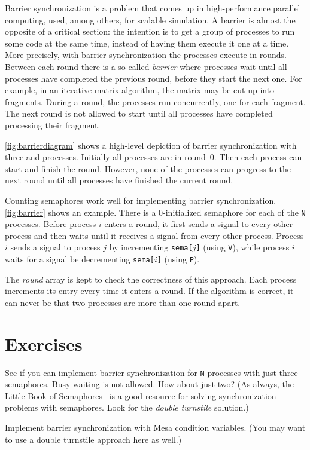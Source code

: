 \documentclass{report}
\begin{document}
Barrier synchronization is a problem that comes up in high-performance
parallel computing, used, among others, for scalable simulation.
A barrier is almost the opposite of a critical section:
the intention is to get a group of processes to run some code at the
same time, instead of having them execute it one at a time.
More precisely, with barrier synchronization the processes execute in rounds.
Between each round there is a so-called \emph{barrier} where processes wait
until all processes have completed the previous round, before they start the
next one.
For example, in an iterative matrix algorithm, the matrix may be
cut up into fragments.  During a round, the processes run concurrently,
one for each fragment.  The next round is not allowed to start
until all processes have completed processing their fragment.

\autoref{fig:barrierdiagram} shows a high-level depiction of barrier synchronization
with three and processes.  Initially all processes are in round~0.  Then each process
can start and finish the round.  However, none of the processes can
progress to the next round until all processes have finished the
current round.

Counting semaphores work well for implementing barrier synchronization.
\autoref{fig:barrier} shows an example.  There is a 0-initialized
semaphore for each of the \texttt{N} processes.
Before process $i$ enters a round, it first sends a signal to every
other process and then waits until it receives a signal from
every other process.  Process $i$ sends a signal to process $j$
by incrementing \texttt{sema[$j$]} (using \texttt{V}),
while process $i$ waits for a signal be decrementing \texttt{sema[$i$]}
(using \texttt{P}).

The \textit{round} array is kept to check the correctness of this
approach.  Each process increments its entry every time it enters
a round.  If the algorithm is correct, it can never be that two processes
are more than one round apart.

\section*{Exercises}
\begin{problems}
\item See if you can implement barrier synchronization for \texttt{N} processes
with just three semaphores.  Busy waiting is not allowed.  How about just two?
(As always, the Little Book of Semaphores~\cite{Downey09} is a good resource
for solving synchronization problems with semaphores.
Look for the \emph{double turnstile}
%
solution.)
\item Implement barrier synchronization with Mesa condition variables.
(You may want to use a double turnstile approach here as well.)
\end{problems}
\end{document}
